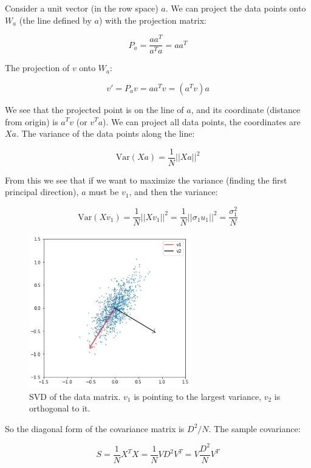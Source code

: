 \documentclass{article}
\begin{document}
Consider a unit vector (in the row space) $a$. We can project the data points onto $W_a$ (the line defined by $a$) with the projection matrix:

\begin{equation}
    P_a = \frac{aa^T}{a^Ta} = aa^T
\end{equation}

The projection of $v$ onto $W_a$:

\begin{equation}
    v' = P_a v = aa^T v = (a^T v) a
\end{equation}

We see that the projected point is on the line of $a$, and its coordinate (distance from origin) is $a^T v$ (or $v^T a$). We can project all data points, the coordinates are $Xa$. The variance of the data points along the line:

\begin{equation}
    \text{Var}(Xa) = \frac{1}{N} ||Xa||^2
\end{equation}

From this we see that if we want to maximize the variance (finding the first principal direction), $a$ must be $v_1$, and then the variance:

\begin{equation}
    \text{Var}(Xv_1) = \frac{1}{N} ||Xv_1||^2 = \frac{1}{N} ||\sigma_1 u_1||^2 = \frac{\sigma_1^2}{N}
\end{equation}


\begin{figure}[ht]
 \centering
  \includegraphics[width=200pt]{images/data_matrix_pca.jpg}
 \caption{SVD of the data matrix. $v_1$ is pointing to the largest variance, $v_2$ is orthogonal to it.}
\end{figure}

So the diagonal form of the covariance matrix is $D^2/N$. The sample covariance:

\begin{equation}
    S = \frac1N X^TX = \frac1N VD^2V^T = V \frac{D^2}{N} V^T
\end{equation}
\end{document}
